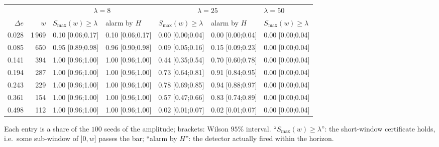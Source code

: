 \documentclass[10pt,a4paper]{article}
\begin{document}
\begin{center}
\begin{tabular}{rrlllll}
\toprule
& & \multicolumn{2}{c}{$\lambda=8$} & \multicolumn{2}{c}{$\lambda=25$} & $\lambda=50$ \\
$\Delta e$ & $w$ & $S_{\max}(w) \ge \lambda$ & alarm by $H$ & $S_{\max}(w) \ge \lambda$ & alarm by $H$ & $S_{\max}(w) \ge \lambda$ \\
\midrule
0.028 & 1\,969 & 0.10 [0.06;0.17] & 0.10 [0.06;0.17] & 0.00 [0.00;0.04] & 0.00 [0.00;0.04] & 0.00 [0.00;0.04] \\
0.085 &   650 & 0.95 [0.89;0.98] & 0.96 [0.90;0.98] & 0.09 [0.05;0.16] & 0.15 [0.09;0.23] & 0.00 [0.00;0.04] \\
0.141 &   394 & 1.00 [0.96;1.00] & 1.00 [0.96;1.00] & 0.44 [0.35;0.54] & 0.70 [0.60;0.78] & 0.00 [0.00;0.04] \\
0.194 &   287 & 1.00 [0.96;1.00] & 1.00 [0.96;1.00] & 0.73 [0.64;0.81] & 0.91 [0.84;0.95] & 0.00 [0.00;0.04] \\
0.243 &   229 & 1.00 [0.96;1.00] & 1.00 [0.96;1.00] & 0.78 [0.69;0.85] & 0.94 [0.88;0.97] & 0.00 [0.00;0.04] \\
0.361 &   154 & 1.00 [0.96;1.00] & 1.00 [0.96;1.00] & 0.57 [0.47;0.66] & 0.83 [0.74;0.89] & 0.00 [0.00;0.04] \\
0.498 &   112 & 1.00 [0.96;1.00] & 1.00 [0.96;1.00] & 0.02 [0.01;0.07] & 0.02 [0.01;0.07] & 0.00 [0.00;0.04] \\
\bottomrule
\end{tabular}

\smallskip
{\small Each entry is a share of the $100$ seeds of the amplitude; brackets: Wilson $95\%$ interval. ``$S_{\max}(w) \ge \lambda$'': the short-window certificate holds, i.e.\ some sub-window of $]0,w]$ passes the bar; ``alarm by $H$'': the detector actually fired within the horizon.}
\end{center}
\end{document}
